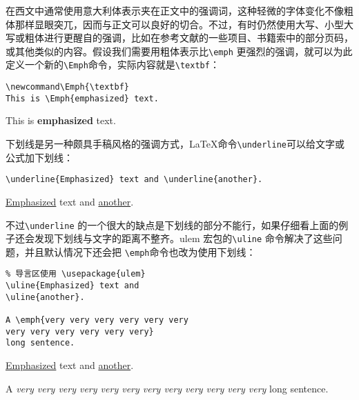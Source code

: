 在西文中通常使用意大利体表示夹在正文中的强调词，这种轻微的字体变化不像粗体那样显眼突兀，因而与正文可以良好的切合。不过，有时仍然使用大写、小型大写或粗体进行更醒自的强调，比如在参考文献的一些项目、书籍索中的部分页码，或其他类似的内容。假设我们需要用粗体表示比\verb|\emph| 更强烈的强调，就可以为此定义一个新的\verb|\Emph|命令，实际内容就是\verb|\textbf|：

\begin{minipage}[t]{0.45\textwidth}
\begin{lstlisting}
\newcommand\Emph{\textbf}
This is \Emph{emphasized} text.
\end{lstlisting}
\end{minipage}
\hfill
\begin{minipage}[t]{0.45\textwidth}
    \newcommand\Emph{\textbf}
    This is \Emph{emphasized} text.
\end{minipage}

下划线是另一种颇具手稿风格的强调方式，\LaTeX 命令\verb|\underline|可以给文字或公式加下划线：

\begin{minipage}[t]{0.45\textwidth}
\begin{lstlisting}
\underline{Emphasized} text and \underline{another}.
\end{lstlisting}
\end{minipage}
\hfill
\begin{minipage}[t]{0.45\textwidth}
    \underline{Emphasized} text and \underline{another}.
\end{minipage}

不过\verb|\underline| 的一个很大的缺点是下划线的部分不能行，如果仔细看上面的例子还会发现下划线与文字的距离不整齐。ulem 宏包的\verb|\uline| 命令解决了这些问题，并且默认情况下还会把 \verb|\emph|命令也改为使用下划线：

\begin{minipage}[t]{0.45\textwidth}
\begin{lstlisting}
% 导言区使用 \usepackage{ulem}
\uline{Emphasized} text and 
\uline{another}.

A \emph{very very very very very very 
very very very very very very} 
long sentence.
\end{lstlisting}
\end{minipage}
\hfill
\begin{minipage}[t]{0.45\textwidth}
    \uline{Emphasized} text and \uline{another}.

A \emph{very very very very very
very very very very very very very} long sentence.
\end{minipage}

